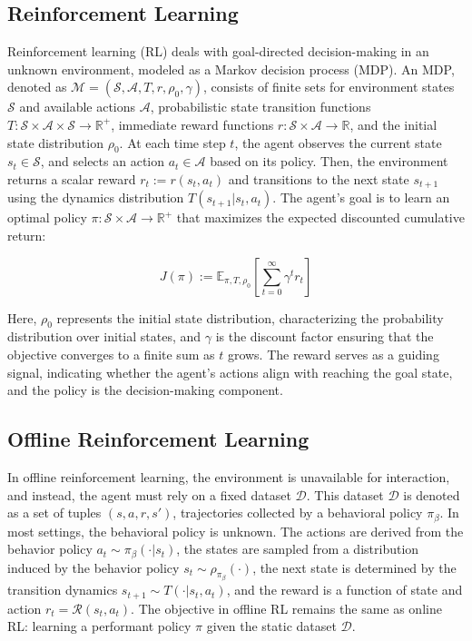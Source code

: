 
\subsection{Reinforcement Learning}
Reinforcement learning (RL) deals with goal-directed decision-making in an unknown environment, modeled as a Markov decision process (MDP). An MDP, denoted as $\mathcal{M} = (\mathcal{S}, \mathcal{A}, T, r, \rho_{0}, \gamma)$, consists of finite sets for environment states $\mathcal{S}$ and available actions $\mathcal{A}$, probabilistic state transition functions $T : \mathcal{S} \times \mathcal{A} \times \mathcal{S} \rightarrow \mathbb{R}^{+}$, immediate reward functions $r : \mathcal{S} \times \mathcal{A} \rightarrow \mathbb{R}$, and the initial state distribution $\rho_0$. At each time step $t$, the agent observes the current state $s_t \in \mathcal{S}$, and selects an action $a_t \in \mathcal{A}$ based on its policy. Then, the environment returns a scalar reward $r_t:=r(s_t, a_t)$ and transitions to the next state $s_{t+1}$ using the dynamics distribution $T(s_{t+1} | s_t, a_t)$. The agent's goal is to learn an optimal policy $\pi: \mathcal{S} \times \mathcal{A} \rightarrow \mathbb{R}^{+}$ that maximizes the expected discounted cumulative return: 

\begin{equation}
    J(\pi) := \mathbb{E}_{\pi, T, \rho_0} \left[ \sum_{t=0}^{\infty} \gamma^t r_t \right]
\end{equation}
 
Here, $\rho_0$ represents the initial state distribution, characterizing the probability distribution over initial states, and $\gamma$ is the discount factor ensuring that the objective converges to a finite sum as $t$ grows. The reward serves as a guiding signal, indicating whether the agent's actions align with reaching the goal state, and the policy is the decision-making component.




\subsection{ Offline Reinforcement Learning}

In offline reinforcement learning, the environment is unavailable for interaction, and instead, the agent must rely on a fixed dataset $\mathcal{D}$. This dataset $\mathcal{D}$ is denoted as a set of tuples $(s, a, r, s')$, trajectories collected by a behavioral policy $\pi_{\beta}$. In most settings, the behavioral policy is unknown. The actions are derived from the behavior policy $a_t \sim \pi_{\beta}( \cdot | s_t)$, the states are sampled from a distribution induced by the behavior policy $s_t \sim \rho_{\pi_{\beta}}(\cdot)$, the next state is determined by the transition dynamics $s_{t+1} \sim T(\cdot | s_t, a_t)$, and the reward is a function of state and action $r_t = \mathcal{R}(s_t, a_t)$. The objective in offline RL remains the same as online RL: learning a performant policy $\pi$ given the static dataset $\mathcal{D}$.


